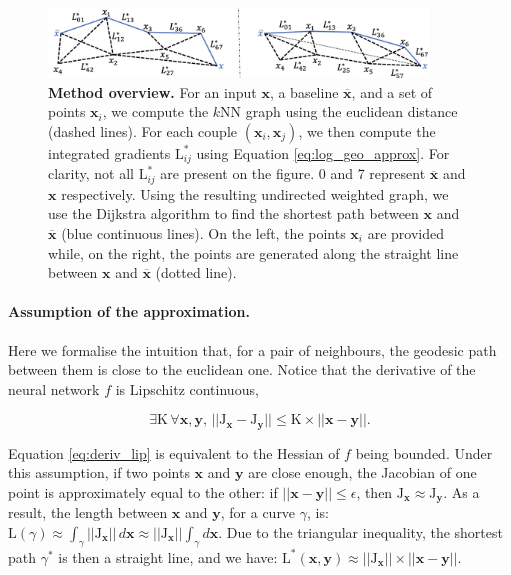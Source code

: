 \begin{figure}[t]
\vskip 0.2in
\begin{center}
\centerline{\includegraphics[width=0.9\textwidth]{figures/method.png}}
\caption{\textbf{Method overview.} For an input $\textbf{x}$, a baseline $\overline{\textbf{x}}$, and a set of points $\textbf{x}_i$, we compute the $k$NN graph using the euclidean distance (dashed lines). For each couple $(\textbf{x}_i, \textbf{x}_j)$, we then compute the integrated gradients $\textrm{L}^*_{ij}$ using Equation \ref{eq:log_geo_approx}. For clarity, not all $\textrm{L}^*_{ij}$ are present on the figure. 0 and 7 represent $\overline{\textbf{x}}$ and $\textbf{x}$ respectively. Using the resulting undirected weighted graph, we use the Dijkstra algorithm to find the shortest path between $\textbf{x}$ and $\overline{\textbf{x}}$ (blue continuous lines). On the left, the points $\textbf{x}_i$ are provided while, on the right, the points are generated along the straight line between $\textbf{x}$ and $\overline{\textbf{x}}$ (dotted line).}
\label{fig:method}
\end{center}
\vskip -0.2in
\end{figure}

\paragraph{Assumption of the approximation.} 

Here we formalise the intuition that, for a pair of neighbours, the geodesic path between them is close to the euclidean one. Notice that the derivative of the neural network $f$ is Lipschitz continuous,

\begin{equation}
    \exists \textrm{K} \, \forall \textbf{x}, \textbf{y}, \, ||\textrm{J}_{\textbf{x}} - \textrm{J}_{\textbf{y}}|| \leq \textrm{K} \times ||\textbf{x} - \textbf{y}||.
\label{eq:deriv_lip}
\end{equation}

Equation \ref{eq:deriv_lip} is equivalent to the Hessian of $f$ being bounded. Under this assumption, if two points $\textbf{x}$ and $\textbf{y}$ are close enough, the Jacobian of one point is approximately equal to the other: if $||\textbf{x} - \textbf{y}|| \le \epsilon$, then $\textrm{J}_{\textbf{x}} \approx \textrm{J}_{\textbf{y}}$. As a result, the length between $\textbf{x}$ and $\textbf{y}$, for a curve $\gamma$, is: $\textrm{L}(\gamma) \approx \int_{\gamma} ||\textrm{J}_{\textbf{x}}|| \, d\textbf{x} \approx ||\textrm{J}_{\textbf{x}}|| \int_{\gamma} d\textbf{x}$. Due to the triangular inequality, the shortest path $\gamma^*$ is then a straight line, and we have: $\textrm{L}^*(\textbf{x}, \textbf{y}) \approx ||\textrm{J}_{\textbf{x}}|| \times ||\textbf{x} - \textbf{y}||$.

